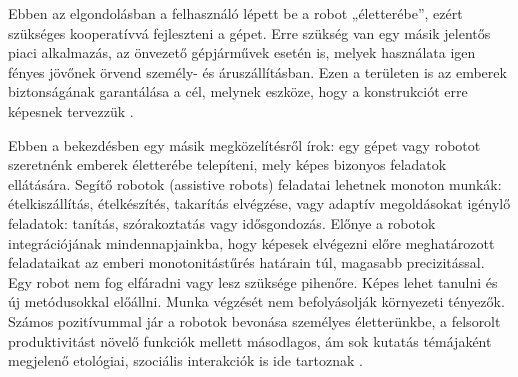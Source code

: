 Ebben az elgondolásban a felhasználó lépett be a robot „életterébe”, ezért szükséges kooperatívvá fejleszteni a gépet. Erre szükség van egy másik jelentős piaci alkalmazás, az önvezető gépjárművek esetén is, melyek használata igen fényes jövőnek örvend személy- és áruszállításban. Ezen a területen is az emberek biztonságának garantálása a cél, melynek eszköze, hogy a konstrukciót erre képesnek tervezzük \cite{artc02}.

Ebben a bekezdésben egy másik megközelítésről írok: egy gépet vagy robotot szeretnénk emberek életterébe telepíteni, mely képes bizonyos feladatok ellátására. Segítő robotok (assistive robots) feladatai lehetnek monoton munkák: ételkiszállítás, ételkészítés, takarítás elvégzése, vagy adaptív megoldásokat igénylő feladatok: tanítás, szórakoztatás vagy idősgondozás\cite{artc021}. Előnye a robotok integrációjának mindennapjainkba, hogy képesek elvégezni előre meghatározott feladataikat az emberi monotonitástűrés határain túl, magasabb precizitással. Egy robot nem fog elfáradni vagy lesz szüksége pihenőre. Képes lehet tanulni és új metódusokkal előállni. Munka végzését nem befolyásolják környezeti tényezők. Számos pozitívummal jár a robotok bevonása személyes életterünkbe, a felsorolt produktivitást növelő funkciók mellett másodlagos, ám sok kutatás témájaként megjelenő etológiai, szociális interakciók is ide tartoznak \cite{artc02}\cite{artc03}.


